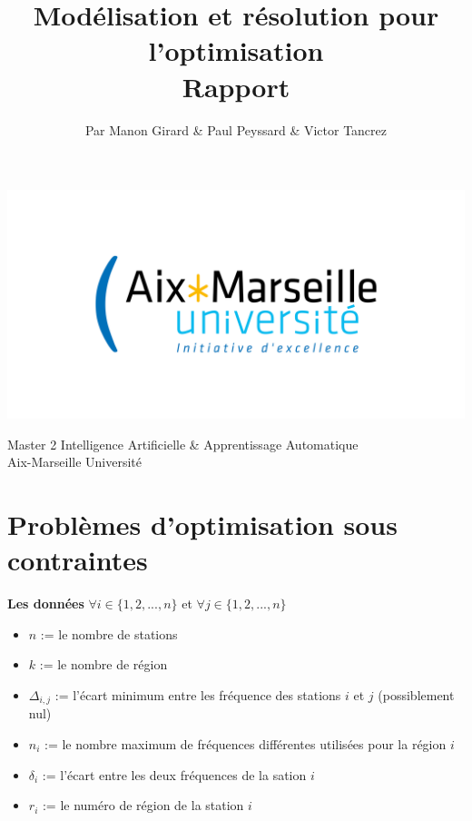 \documentclass[a4paper, 10pt]{article}
\begin{document}
\setlength{\parindent}{0cm}
\setlength{\parskip}{1ex plus 0.5ex minus 0.2ex}
\newcommand{\hsp}{\hspace{20pt}}
\newcommand{\HRule}{\rule{\linewidth}{0.5mm}}

  \title{Modélisation et résolution pour l'optimisation \\ Rapport \\[1ex] \large }
  \author{Par Manon Girard \& Paul Peyssard \& Victor Tancrez}
  \date{}
  \maketitle

  \begin{center}
    \includegraphics[scale=0.2]{images/amu2.png}
  \end{center}

  \vfill
  \begin{center}
    Master 2 Intelligence Artificielle \& Apprentissage Automatique \\
    Aix-Marseille Université \\
  \end{center}
  \pagebreak

  \tableofcontents
  \newpage

  \section{Problèmes d'optimisation sous contraintes}

    \textbf{Les données} $\forall i \in \{1,2,...,n \}$ et $\forall j \in \{1,2,...,n \}$
    \begin{itemize}
      \item $n$ := le nombre de stations
      \item $k$ := le nombre de région
      \item $\Delta_{i,j}$ := l'écart minimum entre les fréquence des stations $i$ et $j$ (possiblement nul)
      \item $n_{i}$ := le nombre maximum de fréquences différentes utilisées pour la région $i$
      \item $\delta_{i}$ := l'écart entre les deux fréquences de la sation $i$
      \item $r_{i}$ := le numéro de région de la station $i$
    \end{itemize}
\end{document}
